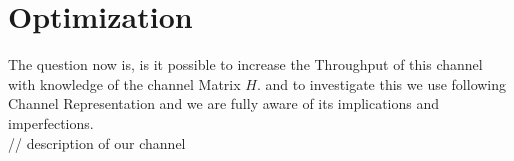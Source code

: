 ﻿\chapter{Optimization}

The question now is, is it possible to increase the Throughput of this channel with knowledge of the channel Matrix $H$. and to investigate this we use following Channel Representation and we are fully aware of its implications and imperfections.
\\// description of our channel





